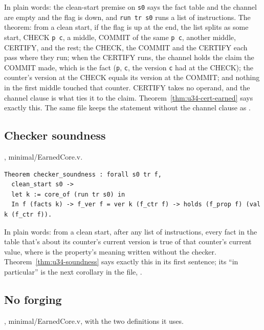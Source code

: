 In plain words: the clean-start premise on \texttt{s0} says the fact table and the channel are
empty and the flag is down, and \texttt{run tr s0} runs a list of instructions. The theorem: from a clean start,
if the flag is up at the end, the list splits as some start, CHECK \texttt{p c}, a middle, COMMIT
of the same \texttt{p c}, another middle, CERTIFY, and the rest; the CHECK, the COMMIT and the
CERTIFY each pass where they run; when the CERTIFY runs, the channel holds the claim the COMMIT
made, which is the fact (\texttt{p}, \texttt{c}, the version \texttt{c} had at the CHECK); the
counter's version at the CHECK equals its version at the COMMIT; and nothing in the first middle
touched that counter. CERTIFY takes no operand, and the channel clause is what ties it to the
claim. Theorem~\ref{thm:u34-cert-earned} says exactly this. The same file keeps the statement
without the channel clause as .

\subsection{Checker soundness}

{\raggedright {}, minimal/EarnedCore.v.\par}

{\scriptsize
\begin{verbatim}
Theorem checker_soundness : forall s0 tr f,
  clean_start s0 ->
  let k := core_of (run tr s0) in
  In f (facts k) -> f_ver f = ver k (f_ctr f) -> holds (f_prop f) (val k (f_ctr f)).
\end{verbatim}}

In plain words: from a clean start, after any list of instructions, every fact in the table
that's about its counter's current version is true of that counter's current value, where
 is the property's meaning written without the checker.
Theorem~\ref{thm:u34-soundness} says exactly this in its first sentence; its ``in particular''
is the next corollary in the file, .

\subsection{No forging}

{\raggedright {}, minimal/EarnedCore.v, with the two definitions it uses.\par}

